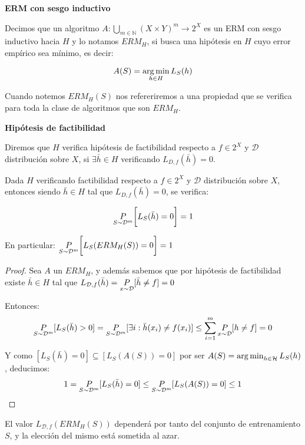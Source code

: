 \begin{definition*} \textbf{ERM con sesgo inductivo}

Decimos que un algoritmo $A: \underset{m\in \mathbb{N}}{\bigcup} (X\times Y)^m \rightarrow 2^{X}$ es un ERM con sesgo 
inductivo hacia $H$ y lo notamos $ERM_H$, si busca una hipótesis en $H$ cuyo error empírico 
sea mínimo, es decir:

\[A(S) = \operatorname*{arg\,min}_{h\in H} L_S(h)\]
\end{definition*}

Cuando notemos $ERM_H(S)$ nos refereriremos a una propiedad que se verifica para toda la clase de algoritmos que 
son $ERM_H$.

\begin{definition*} \textbf{Hipótesis de factibilidad}

Diremos que $H$ verifica hipótesis de factibilidad respecto a $f\in 2^X$ y $\mathcal{D}$ distribución sobre $X$, si 
$\exists {\bar{h}} \in H$ verificando $L_{D,f}(\bar{h}) = 0$.
\end{definition*}

\begin{fact}
Dada $H$ verificando factibilidad respecto a $f\in 2^X$ y $\mathcal{D}$ distribución sobre $X$, entonces siendo 
${\bar{h}} \in H$ tal que $L_{D,f}(\bar{h}) = 0$, se verifica:

\[\underset{S\sim \mathcal{D}^m}{P} \bigg[L_S(\bar{h}) = 0 \bigg] = 1\]

En particular: $\underset{S\sim \mathcal{D}^m}{P} \bigg[L_S(ERM_H(S)) = 0 \bigg] = 1$
\label{fact:ermh}
\end{fact}

  \begin{proof}
  Sea $A$ un $ERM_H$, y además sabemos que por hipótesis de factibilidad existe $\bar{h} \in H$ tal que
  $L_{\mathcal{D},f}(\bar{h}) = \underset{x\sim \mathcal{D}}{P}[\bar{h}\neq f] = 0$

  Entonces: \[\underset{S\sim \mathcal{D}^m}{P}[L_S(\bar{h}) > 0] = \underset{S\sim \mathcal{D}^m}{P}
  [\exists i: \bar{h}(x_i) \neq f(x_i)] \le \sum_{i=1}^m \underset{x\sim \mathcal{D}}{P}[h\neq f] = 0\]

  Y como $[L_S(\bar{h}) = 0] \subseteq [L_S(A(S)) = 0]$ por ser $A(S) = \operatorname*{arg\,min}_{h\in \mathcal{H}} L_S(h)$, deducimos:
  \[1 = \underset{S\sim \mathcal{D}^m}{P}[L_S(\bar{h}) = 0] \le \underset{S\sim \mathcal{D}^m}{P}[L_S(A(S)) = 0] \le 1\]
  \end{proof}

El valor $L_{\mathcal{D},f}(ERM_H(S))$ dependerá por tanto del conjunto de entrenamiento $S$, y la elección del
mismo está sometida al azar. 

